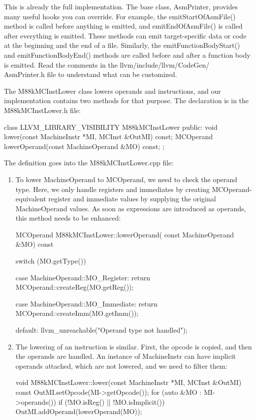 This is already the full implementation. The base class, AsmPrinter, provides many useful hooks you can override. For example, the emitStartOfAsmFile() method is called before anything is emitted, and emitEndOfAsmFile() is called after everything is emitted. These methods can emit target-specific data or code at the beginning and the end of a file. Similarly, the emitFunctionBodyStart() and emitFunctionBodyEnd() methods are called before and after a function body is emitted. Read the comments in the llvm/include/llvm/CodeGen/ AsmPrinter.h file to understand what can be customized.

The M88kMCInstLower class lowers operands and instructions, and our implementation contains two methods for that purpose. The declaration is in the M88kMCInstLower.h file:

\begin{cpp}
class LLVM_LIBRARY_VISIBILITY M88kMCInstLower {
public:
    void lower(const MachineInstr *MI, MCInst &OutMI) const;
    MCOperand lowerOperand(const MachineOperand &MO) const;
};
\end{cpp}

The definition goes into the M88kMCInstLower.cpp file:

\begin{enumerate}
\item
To lower MachineOperand to MCOperand, we need to check the operand type. Here, we only handle registers and immediates by creating MCOperand-equivalent register and immediate values by supplying the original MachineOperand values. As soon as expressions are introduced as operands, this method needs to be enhanced:

\begin{cpp}
MCOperand M88kMCInstLower::lowerOperand(
        const MachineOperand &MO) const {
    switch (MO.getType()) {
    case MachineOperand::MO_Register:
        return MCOperand::createReg(MO.getReg());

    case MachineOperand::MO_Immediate:
        return MCOperand::createImm(MO.getImm());

    default:
        llvm_unreachable("Operand type not handled");
    }
}
\end{cpp}

\item
The lowering of an instruction is similar. First, the opcode is copied, and then the operands are handled. An instance of MachineInstr can have implicit operands attached, which are not lowered, and we need to filter them:

\begin{cpp}
void M88kMCInstLower::lower(const MachineInstr *MI,
MCInst &OutMI) const {
    OutMI.setOpcode(MI->getOpcode());
    for (auto &MO : MI->operands()) {
        if (!MO.isReg() || !MO.isImplicit())
            OutMI.addOperand(lowerOperand(MO));
    }
}
\end{cpp}
\end{enumerate}

